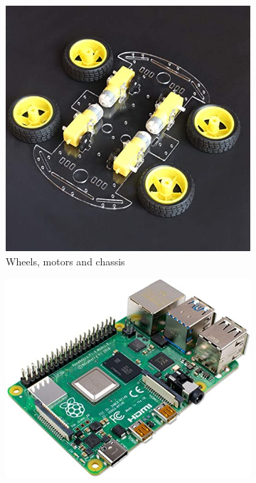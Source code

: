 \documentclass[12pt,a4paper]{article}
\begin{document}
\begin{large}
\begin{figure}[hb]
  \centering
  \begin{subfigure}{0.2\textwidth}
    \centering
    \includegraphics[width = \textwidth]{images/Chassis.jpg}
    \caption{Wheels, motors and chassis}
    \label{fig:left}
    \end{subfigure}
  \begin{subfigure}{0.2\textwidth}
    \centering
    \includegraphics[width = \textwidth]{images/rasp.jpg}

\end{subfigure}
\end{figure}
\end{large}
\end{document}
